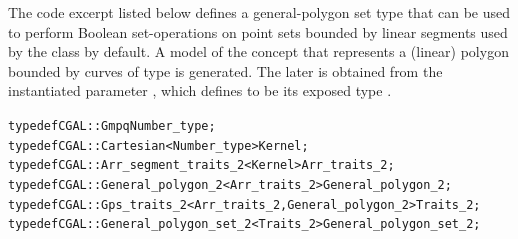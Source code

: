 The code excerpt listed below defines a general-polygon set type that
can be used to perform Boolean set-operations on point sets bounded by
linear segments used by the  class by default. A
model of the  concept that represents a
(linear) polygon bounded by curves of type  is
generated. The later is obtained from the instantiated parameter
, which defines  to be
its exposed type .
\begin{alltt}
typedef CGAL::Gmpq                              	   Number_type;
typedef CGAL::Cartesian<Number_type>            	   Kernel;
typedef CGAL::Arr_segment_traits_2<Kernel>      	   Arr_traits_2;
typedef CGAL::General_polygon_2<Arr_traits_2>   	   General_polygon_2;
typedef CGAL::Gps_traits_2<Arr_traits_2,General_polygon_2> Traits_2;
typedef CGAL::General_polygon_set_2<Traits_2>              General_polygon_set_2;
\end{alltt}

